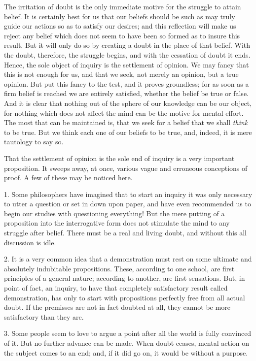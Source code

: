\documentclass[]{article}
\begin{document}
The irritation of doubt is the only immediate motive for the struggle to attain belief. It is certainly best for us that our beliefs should be such as may truly guide our actions so as to satisfy our desires; and this reflection will make us reject any belief which does not seem to have been so formed as to insure this result. But it will only do so by creating a doubt in the place of that belief. With the doubt, therefore, the struggle begins, and with the cessation of doubt it ends. Hence, the sole object of inquiry is the settlement of opinion. We may fancy that this is not enough for us, and that we seek, not merely an opinion, but a true opinion. But put this fancy to the test, and it proves groundless; for as soon as a firm belief is reached we are entirely satisfied, whether the belief be true or false. And it is clear that nothing out of the sphere of our knowledge can be our object, for nothing which does not affect the mind can be the motive for mental effort. The most that can be maintained is, that we seek for a belief that we shall \emph{think}  to be true. But we think each one of our beliefs to be true, and, indeed, it is mere tautology to say so.

That the settlement of opinion is the sole end of inquiry is a very important proposition. It sweeps away, at once, various vague and erroneous conceptions of proof. A few of these may be noticed here.

1. Some philosophers have imagined that to start an inquiry it was only necessary to utter a question or set in down upon paper, and have even recommended us to begin our studies with questioning everything!  But the mere putting of a proposition into the interrogative form does not stimulate the mind to any struggle after belief.  There must be a real and living doubt, and without this all discussion is idle. 

2. It is a very common idea that a demonstration must rest on some ultimate and absolutely indubitable propositions. These, according to one school, are first principles of a general nature; according to another, are first sensations. But, in point of fact, an inquiry, to have that completely satisfactory result called demonstration, has only to start with propositions perfectly free from all actual doubt. If the premisses are not in fact doubted at all, they cannot be more satisfactory than they are.

3. Some people seem to love to argue a point after all the world is fully convinced of it. But no further advance can be made. When doubt ceases, mental action on the subject comes to an end; and, if it did go on, it would be without a purpose.
\end{document}
